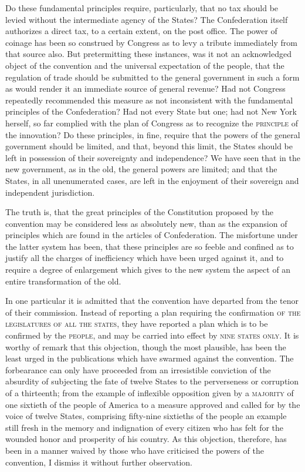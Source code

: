 Do these fundamental principles require, particularly, that no tax should be levied without the intermediate agency of the States? 
The Confederation itself authorizes a direct tax, to a certain extent, on the post office. 
The power of coinage has been so construed by Congress as to levy a tribute immediately from that source also. 
But pretermitting these instances, was it not an acknowledged object of the convention and the universal expectation of the people, that the regulation of trade should be submitted to the general government in such a form as would render it an immediate source of general revenue? 
Had not Congress repeatedly recommended this measure as not inconsistent with the fundamental principles of the Confederation? 
Had not every State but one; had not New York herself, so far complied with the plan of Congress as to recognize the \textsc{principle} of the innovation? 
Do these principles, in fine, require that the powers of the general government should be limited, and that, beyond this limit, the States should be left in possession of their sovereignty and independence? 
We have seen that in the new government, as in the old, the general powers are limited; and that the States, in all unenumerated cases, are left in the enjoyment of their sovereign and independent jurisdiction.

The truth is, that the great principles of the Constitution proposed by the convention may be considered less as absolutely new, than as the expansion of principles which are found in the articles of Confederation. 
The misfortune under the latter system has been, that these principles are so feeble and confined as to justify all the charges of inefficiency which have been urged against it, and to require a degree of enlargement which gives to the new system the aspect of an entire transformation of the old.

In one particular it is admitted that the convention have departed from the tenor of their commission. 
Instead of reporting a plan requiring the confirmation \textsc{of the legislatures of all the states}, they have reported a plan which is to be confirmed by the \textsc{people}, and may be carried into effect by \textsc{nine states only}. 
It is worthy of remark that this objection, though the most plausible, has been the least urged in the publications which have swarmed against the convention. 
The forbearance can only have proceeded from an irresistible conviction of the absurdity of subjecting the fate of twelve States to the perverseness or corruption of a thirteenth; from the example of inflexible opposition given by a \textsc{majority} of one sixtieth of the people of America to a measure approved and called for by the voice of twelve States, comprising fifty-nine sixtieths of the people an example still fresh in the memory and indignation of every citizen who has felt for the wounded honor and prosperity of his country. 
As this objection, therefore, has been in a manner waived by those who have criticised the powers of the convention, I dismiss it without further observation.

